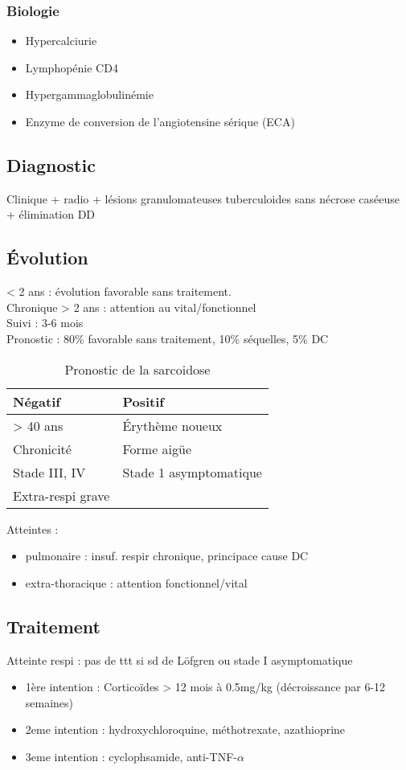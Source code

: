 \subsubsection{Biologie}
\label{sec:orgbfe5d87}
\begin{itemize}
\item Hypercalciurie
\item Lymphopénie CD4
\item Hypergammaglobulinémie
\item Enzyme de conversion de l'angiotensine sérique (ECA)
\end{itemize}
\subsection{Diagnostic}
\label{sec:org6670330}
Clinique + radio + lésions granulomateuses tuberculoides sans nécrose caséeuse +
élimination DD
\subsection{Évolution}
\label{sec:org707f9ea}
< 2 ans : évolution favorable sans traitement.\\
Chronique > 2 ans : attention au vital/fonctionnel \\
Suivi : 3-6 mois\\
Pronostic : 80\% favorable sans traitement, 10\% séquelles, 5\% DC

\begin{table}[htbp]
  \caption{Pronostic de la sarcoidose}
  \centering
  \begin{tabular}{ll}
    \toprule
    Négatif & Positif\\
    \midrule
    > 40 ans & Érythème noueux\\
    Chronicité & Forme aigüe\\
    Stade III, IV & Stade 1 asymptomatique\\
    Extra-respi grave & \\
    \bottomrule
  \end{tabular}
\end{table}

Atteintes :
\begin{itemize}
\item pulmonaire : insuf. respir chronique, principace cause DC
\item extra-thoracique : attention fonctionnel/vital
\end{itemize}

\subsection{Traitement}
\label{sec:orgc05b9f6}
Atteinte respi : pas de ttt si sd de Löfgren ou stade I asymptomatique\\
\begin{itemize}
\item 1ère intention : Corticoïdes > 12 mois à 0.5mg/kg (décroissance par 6-12 semaines)
\item 2eme intention : hydroxychloroquine, méthotrexate, azathioprine
\item 3eme intention : cyclophsamide, anti-TNF-\(\alpha\)
\end{itemize}

